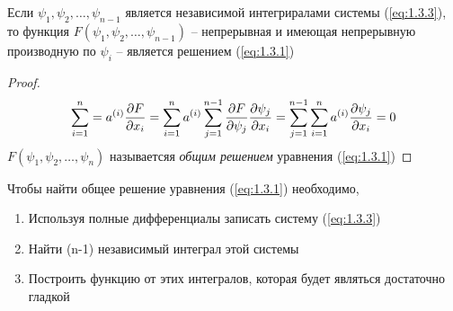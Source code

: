 \documentclass[../main.tex]{subfiles}
\begin{document}
\begin{theorem}
	Если $\psi_1, \psi_2, \dots, \psi_{n-1}$ является независимой интегриралами системы (\ref*{eq:1.3.3}),
	то функция $F(\psi_1, \psi_2, \dots, \psi_{n-1})$ -- непрерывная и имеющая непрерывную
	производную по $\psi_i$ -- является решением (\ref*{eq:1.3.1})
\end{theorem}
\begin{proof}
	\begin{gather*}
		\sum_{i=1}^n = a^{(i)}\frac{\partial F}{\partial x_i} =
		\sum_{i=1}^n a^{(i)} \sum_{j=1}^{n-1}\frac{\partial F}{\partial \psi_j}\frac{\partial \psi_j}{\partial x_i} =
		\sum_{j=1}^{n-1} \sum_{i=1}^n a^{(i)} \frac{\partial \psi_j}{\partial x_i} = 0
	\end{gather*}
	$F(\psi_1, \psi_2,\dots,\psi_n)$ называетсяя \textit{общим решением} уравнения (\ref*{eq:1.3.1})
\end{proof}
Чтобы найти общее решение уравнения (\ref*{eq:1.3.1}) необходимо,
\begin{enumerate}
	\item Используя полные дифференциалы записать систему (\ref*{eq:1.3.3})
	\item Найти (n-1) независимый интеграл этой системы
	\item Построить функцию от этих интегралов, которая будет являться достаточно гладкой
\end{enumerate}
\end{document}
